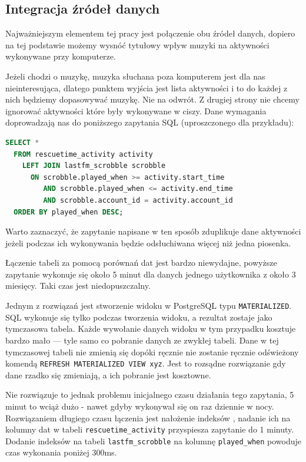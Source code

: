 \documentclass[brudnopis]{xmgr}
\begin{document}
        \subsection{Integracja źródeł danych}

            Najważniejszym elementem tej pracy jest połączenie obu źródeł danych,
            dopiero na tej podstawie możemy wysnóć tytułowy wpływ muzyki na aktywności wykonywane przy komputerze.

            Jeżeli chodzi o muzykę, muzyka słuchana poza komputerem jest dla nas nieinteresująca,
            dlatego punktem wyjścia jest lista aktywności i to do każdej z nich będziemy dopasowywać muzykę. Nie na odwrót.
            Z drugiej strony nie chcemy ignorować aktywności które były wykonywane w ciszy.
            Dane wymagania doprowadzają nas do poniższego zapytania SQL (uproszczonego dla przykładu):

\begin{lstlisting}[language=sql]
SELECT *
  FROM rescuetime_activity activity
    LEFT JOIN lastfm_scrobble scrobble
      ON scrobble.played_when >= activity.start_time
         AND scrobble.played_when <= activity.end_time
         AND scrobble.account_id = activity.account_id
  ORDER BY played_when DESC;
\end{lstlisting}

            Warto zaznaczyć, że zapytanie napisane w ten sposób zduplikuje dane aktywności
            jeżeli podczas ich wykonywania będzie odsłuchiwana więcej niż jedna piosenka.

            Łączenie tabeli za pomocą porównań dat jest bardzo niewydajne,
            powyższe zapytanie wykonuje się około 5 minut dla danych jednego użytkownika z około 3 miesięcy.
            Taki czas jest niedopuszczalny.

            Jednym z rozwiązań jest stworzenie widoku w PostgreSQL typu \verb|MATERIALIZED|.
            SQL wykonuje się tylko podczas tworzenia widoku, a rezultat zostaje jako tymczasowa tabela.
            Każde wywołanie danych widoku w tym przypadku kosztuje bardzo mało --- tyle samo co pobranie danych ze zwykłej tabeli.
            Dane w tej tymczasowej tabeli nie zmienią się dopóki ręcznie nie zostanie ręcznie odświeżony komendą
            \verb|REFRESH MATERIALIZED VIEW xyz|. Jest to rozsądne rozwiązanie gdy dane rzadko się zmieniają, a ich pobranie jest kosztowne.

            Nie rozwiązuje to jednak problemu inicjalnego czasu działania tego zapytania, 5 minut to wciąż dużo - nawet gdyby wykonywał się on raz dziennie w nocy.
            Rozwiązaniem długiego czasu łączenia jest nałożenie indeksów \cite{postgresql:efficient-indexes}, nadanie ich na kolumny dat w tabeli \verb|rescuetime_activity| przyspiesza zapytanie do 1 minuty.
            Dodanie indeksów na tabeli \verb|lastfm_scrobble| na kolumnę \verb|played_when| powoduje czas wykonania poniżej 300ms.
\end{document}

